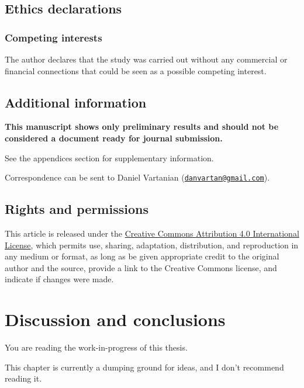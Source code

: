 \documentclass[
12pt,
openright,
oneside,
a4paper,
chapter=TITLE,
section=TITLE,
french,
spanish,
brazil,
english
]{abntex2}\usepackage{array}
\newcommand{\microskip}{\vspace{\microskipamount}}
\begin{document}
\section{Ethics declarations}\label{ethics-declarations}

\subsection{Competing interests}\label{competing-interests}

The author declares that the study was carried out without any
commercial or financial connections that could be seen as a possible
competing interest.

\section{Additional information}\label{additional-information}

\textbf{This manuscript shows only preliminary results and should not be
considered a document ready for journal submission.}

See the appendices section for supplementary information.

Correspondence can be sent to Daniel Vartanian
(\href{mailto:danvartan@gmail.com}{\nolinkurl{danvartan@gmail.com}}).

\section{Rights and permissions}\label{rights-and-permissions}

This article is released under the
\href{http://creativecommons.org/licenses/by/4.0/}{Creative Commons
Attribution 4.0 International License}, which permits use, sharing,
adaptation, distribution, and reproduction in any medium or format, as
long as be given appropriate credit to the original author and the
source, provide a link to the Creative Commons license, and indicate if
changes were made.


\chapter{Discussion and conclusions}\label{discussion-and-conclusions}

\begin{tcolorbox}[enhanced jigsaw, colframe=quarto-callout-important-color-frame, coltitle=black, opacityback=0, left=2mm, opacitybacktitle=0.6, rightrule=.15mm, leftrule=.75mm, colbacktitle=quarto-callout-important-color!10!white, titlerule=0mm, title=\textcolor{quarto-callout-important-color}{\faExclamation}\hspace{0.5em}{Important}, colback=white, breakable, bottomtitle=1mm, toptitle=1mm, arc=.35mm, bottomrule=.15mm, toprule=.15mm]

You are reading the work-in-progress of this thesis.

\microskip

This chapter is currently a dumping ground for ideas, and I don't
recommend reading it.

\end{tcolorbox}
\end{document}
